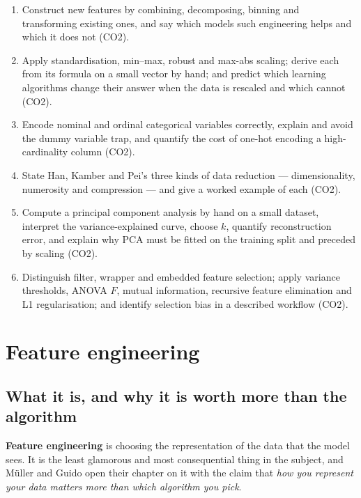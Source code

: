 \documentclass[11pt]{article}
\begin{document}
\begin{enumerate}[leftmargin=*]
  \item Construct new features by combining, decomposing, binning and
    transforming existing ones, and say which models such engineering helps
    and which it does not (CO2).
  \item Apply standardisation, min--max, robust and max-abs scaling; derive
    each from its formula on a small vector by hand; and predict which
    learning algorithms change their answer when the data is rescaled and
    which cannot (CO2).
  \item Encode nominal and ordinal categorical variables correctly, explain
    and avoid the dummy variable trap, and quantify the cost of one-hot
    encoding a high-cardinality column (CO2).
  \item State Han, Kamber and Pei's three kinds of data reduction ---
    dimensionality, numerosity and compression --- and give a worked example
    of each (CO2).
  \item Compute a principal component analysis by hand on a small dataset,
    interpret the variance-explained curve, choose $k$, quantify
    reconstruction error, and explain why PCA must be fitted on the training
    split and preceded by scaling (CO2).
  \item Distinguish filter, wrapper and embedded feature selection; apply
    variance thresholds, ANOVA $F$, mutual information, recursive feature
    elimination and L1 regularisation; and identify selection bias in a
    described workflow (CO2).
\end{enumerate}

\section{Feature engineering}
\label{sec:fe}

\subsection{What it is, and why it is worth more than the algorithm}

\textbf{Feature engineering} is choosing the representation of the data that
the model sees. It is the least glamorous and most consequential thing in the
subject, and Müller and Guido open their chapter on it with the claim that
\emph{how you represent your data matters more than which algorithm you pick}.
\end{document}
